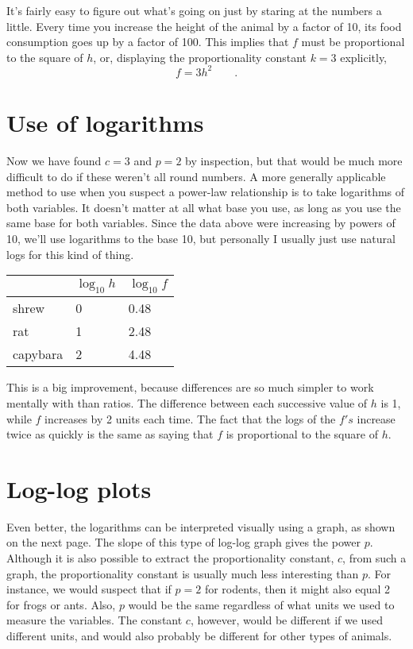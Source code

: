 It's fairly easy to figure out what's going on just by
staring at the numbers a little. Every time you increase the
height of the animal by a factor of 10, its food consumption
goes up by a factor of 100. This implies that $f$ must be
proportional to the square of $h$, or, displaying the
proportionality constant $k=3$ explicitly,
\begin{equation*}
	f=3h^2   \qquad   .
\end{equation*}

\section*{Use of logarithms}
Now we have found $c=3$ and $p=2$ by inspection, but that
would be much more difficult to do if these weren't all
round numbers. A more generally applicable method to use
when you suspect a power-law relationship is to take
logarithms of both variables. It doesn't matter at all what
base you use, as long as you use the same base for both
variables. Since the data above were increasing by powers of
10, we'll use logarithms to the base 10, but personally I
usually just use natural logs for this kind of thing.

\begin{tabular}{lp{30mm}p{30mm}}
			& $\log_{10} h$ & $\log_{10} f$ \\
\hline
	shrew	&	0	& 0.48\\
	rat		&	1	& 2.48\\
	capybara	& 2	& 4.48
\end{tabular}


This is a big improvement, because differences are so much
simpler to work mentally with than ratios. The difference
between each successive value of $h$ is 1, while $f$ increases
by 2 units each time. The fact that the logs of the $f's$
increase twice as quickly is the same as saying that $f$ is
proportional to the square of $h$.

\section*{Log-log plots}

Even better, the logarithms can be interpreted visually
using a graph, as shown on the next page. The slope of this type of
log-log graph gives the power $p$. Although it is also
possible to extract the proportionality constant, $c$, from
such a graph, the proportionality constant is usually much
less interesting than $p$. For instance, we would suspect
that if $p=2$ for rodents, then it might also equal 2 for
frogs or ants. Also, $p$ would be the same regardless of
what units we used to measure the variables. The constant
$c$, however, would be different if we used different units,
and would also probably be different for other types of animals.

